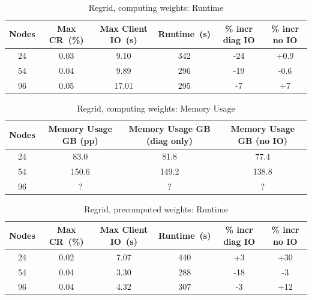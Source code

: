 \begin{table}[ht!]
\scriptsize
  \begin{center}
    \caption{Regrid, computing weights: Runtime}
    \label{tab:table5}
     \begin{tabular}{|c|c|c|c|c|c|}
      \textbf{Nodes} & \textbf{Max CR~(\%)} & \textbf{Max Client IO~(s)} & \textbf{Runtime~(s)} & \textbf{\% incr diag IO} & \textbf{\% incr no IO}\\
      \hline
      24 & 0.03 & 9.10 & 342 & -24 & +0.9 \\ 
      54 & 0.04 & 9.89 & 296 & -19 & -0.6 \\
      96 & 0.05 & 17.01 & 295 & -7 & +7 \\
    \end{tabular}
  \end{center}
\end{table}

\begin{table}[ht!]
\scriptsize
  \begin{center}
    \caption{Regrid, computing weights: Memory Usage}
    \label{tab:table6}
     \begin{tabular}{|c|c|c|c|}
      \textbf{Nodes} & \textbf{Memory Usage GB (pp) } & \textbf{Memory Usage GB (diag only)} & \textbf{Memory Usage GB (no IO)} \\
      \hline
      24 & 83.0 & 81.8 & 77.4 \\
      54 & 150.6 & 149.2 & 138.8 \\
      96 & ? & ? & ? \\
    \end{tabular}
  \end{center}
\end{table}

\begin{table}[ht!]
\scriptsize
  \begin{center}
    \caption{Regrid, precomputed weights: Runtime}
    \label{tab:table7}
     \begin{tabular}{|c|c|c|c|c|c|}
      \textbf{Nodes} & \textbf{Max CR~(\%)} & \textbf{Max Client IO~(s)} & \textbf{Runtime~(s)} & \textbf{\% incr diag IO} & \textbf{\% incr no IO}\\
      \hline
      24 & 0.02 & 7.07 & 440 & +3 & +30 \\
      54 & 0.04 & 3.30 & 288 & -18 & -3 \\
      96 & 0.04 & 4.32 & 307 & -3 & +12 \\
    \end{tabular}
  \end{center}
\end{table}

